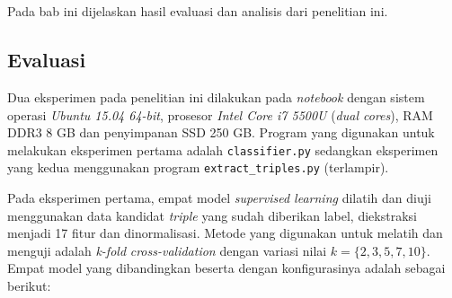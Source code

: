 \chapter{\babEmpat}
\label{chap:babEmpat}

Pada bab ini dijelaskan hasil evaluasi dan analisis dari penelitian ini.

\section{Evaluasi}

Dua eksperimen pada penelitian ini dilakukan pada \textit{notebook} dengan sistem operasi \textit{Ubuntu 15.04 64-bit}, prosesor \textit{Intel Core i7 5500U} (\textit{dual cores}), RAM DDR3 8 GB dan penyimpanan SSD 250 GB. Program yang digunakan untuk melakukan eksperimen pertama adalah \verb|classifier.py| sedangkan eksperimen yang kedua menggunakan program \verb|extract_triples.py| (terlampir).

Pada eksperimen pertama, empat model \textit{supervised learning} dilatih dan diuji menggunakan data kandidat \textit{triple} yang sudah diberikan label, diekstraksi menjadi 17 fitur dan dinormalisasi. Metode yang digunakan untuk melatih dan menguji adalah \textit{k-fold} \textit{cross-validation} \citep{kohavi1995study} dengan variasi nilai $k = \{2, 3, 5, 7, 10\}$. Empat model yang dibandingkan beserta dengan konfigurasinya adalah sebagai berikut:

